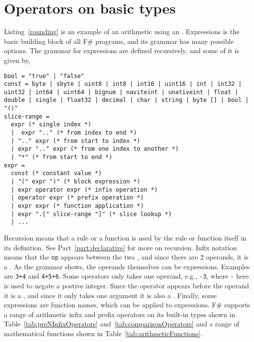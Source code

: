 \section{Operators on basic types}
Listing~\ref{rounding} is an example of an arithmetic  using an . Expressions is the basic building block of all F\# programs, and its grammar has many possible options. The grammar for expressions are defined recursively, and some of it is given by, 
%
\begin{lstlisting}[language=ebnf,caption=expressionArithmetic]
bool = "true" | "false"
const = byte | sbyte | uint8 | int8 | int16 | uint16 | int | int32 | uint32 | int64 | uint64 | bignum | naviteint | unativeint | float | double | single | float32 | decimal | char | string | byte [] | bool | "()"
slice-range = 
  expr (* single index *)
  |  expr ".." (* from index to end *)
  | ".." expr (* from start to index *)
  | expr ".." expr (* from one index to another *)
  | "*" (* from start to end *)
expr = 
  const (* constant value *)
  | "(" expr ")" (* block expression *)
  | expr operator expr (* infix operation *)
  | operator expr (* prefix operation *)
  | expr expr (* function application *)
  | expr ".[" slice-range "]" (* slice lookup *)
  | ...
\end{lstlisting}
%
Recursion means that a rule or a function is used by the rule or function itself in its definition. See Part~\ref{part:declarative} for more on recursion. Infix notation means that the  \lstinline[language=ebnf]!op! appears between the two , and since there are 2 operands, it is a . As the grammar shows, the operands themselves can be expressions. Examples are \lstinline!3+4! and \lstinline!4+5+6!. Some operators only takes one operand, e.g., \lstinline!-3!, where \lstinline!-! here is used to negate a postive integer. Since the operator appears before the operand it is a , and since it only takes one argument it is also a . Finally, some expressions are function names, which can be applied to expressions. F\# supports a range of arithmetic infix and prefix operators on its built-in types shown in Table~\ref{tab:preNInfixOperators} and~\ref{tab:comparisonOperators} and a range of mathematical functions shown in Table~\ref{tab:arithmeticFunctions}.

